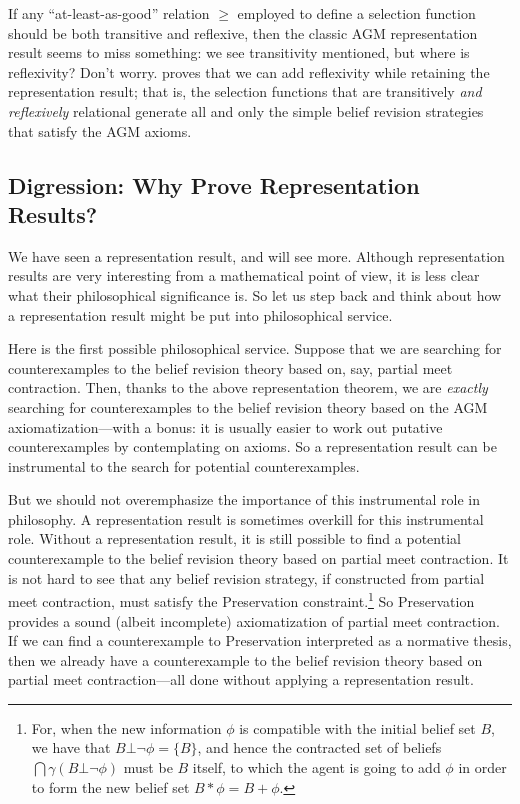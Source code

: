 If any ``at-least-as-good'' relation $\ge$ employed to define a selection function should be both transitive and reflexive, then the classic AGM representation result seems to miss something: we see transitivity mentioned, but where is reflexivity? Don't worry. \citet{rott1993belief} proves that we can add reflexivity while retaining the representation result; that is, the selection functions that are transitively {\em and reflexively} relational generate all and only the simple belief revision strategies that satisfy the AGM axioms.



\subsection{Digression: Why Prove Representation Results?}

We have seen a representation result, and will see more. Although representation results are very interesting from a mathematical point of view, it is less clear what their philosophical significance is. So let us step back and think about how a representation result might be put into philosophical service. 

Here is the first possible philosophical service. Suppose that we are searching for counterexamples to the belief revision theory based on, say, partial meet contraction. Then, thanks to the above representation theorem, we are {\em exactly} searching for counterexamples to the belief revision theory based on the AGM axiomatization---with a bonus: it is usually easier to work out putative counterexamples by contemplating on axioms. So a representation result can be instrumental to the search for potential counterexamples. 

But we should not overemphasize the importance of this instrumental role in philosophy. A representation result is sometimes overkill for this instrumental role. Without a representation result, it is still possible to find a potential counterexample to the belief revision theory based on partial meet contraction. It is not hard to see that any belief revision strategy, if constructed from partial meet contraction, must satisfy the Preservation constraint.\footnote
	{For, when the new information $\phi$ is compatible with the initial belief set $B$, we have that $B \bot \neg\phi = \{B\}$, and hence the contracted set of beliefs $\bigcap \gamma(B \bot \neg\phi)$ must be $B$ itself, to which the agent is going to add $\phi$ in order to form the new belief set $B * \phi = B + \phi$.}
So Preservation provides a sound (albeit incomplete) axiomatization of partial meet contraction. If we can find a counterexample to Preservation interpreted as a normative thesis, then we already have a counterexample to the belief revision theory based on partial meet contraction---all done without applying a representation result. 

